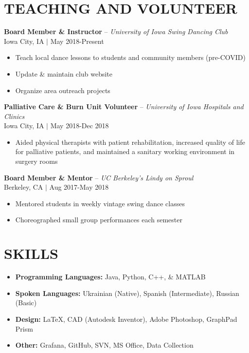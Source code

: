 \documentclass[line,margin]{res}
\begin{document}
\begin{resume}
\section{TEACHING AND VOLUNTEER} 


    {\bf Board Member \& Instructor} -- {\sl University of Iowa Swing Dancing Club} \\
    {\small Iowa City, IA $|$ May 2018-Present} 
    
     \begin{itemize} \itemsep -3pt
       \item Teach local dance lessons to students and community members (pre-COVID)
       \item Update \& maintain club website
       \item Organize area outreach projects
    \end{itemize}
    
    {\bf Palliative Care \& Burn Unit Volunteer} -- {\sl University of Iowa Hospitals and Clinics} \\
    {\small Iowa City, IA $|$ May 2018-Dec 2018} 
    
     \begin{itemize} \itemsep -3pt
       \item Aided physical therapists with patient rehabilitation, increased quality of life for palliative patients, and maintained a sanitary working environment in surgery rooms
    \end{itemize}
    
    {\bf Board Member \& Mentor} -- {\sl UC Berkeley's Lindy on Sproul} \\
    {\small Berkeley, CA $|$ Aug 2017-May 2018} 
    
     \begin{itemize} \itemsep -3pt
       \item Mentored students in weekly vintage swing dance classes
       \item Choreographed small group performances each semester
    \end{itemize}
    
\section{SKILLS}

    \begin{itemize}[leftmargin=*] \itemsep -2pt
	\item \textbf{Programming Languages:} Java, Python, C++, \& MATLAB
	\item \textbf{Spoken Languages:} Ukrainian (Native), Spanish (Intermediate), Russian (Basic)
	\item \textbf{Design:} LaTeX, CAD (Autodesk Inventor), Adobe Photoshop, GraphPad Prism
	\item \textbf{Other:} Grafana, GitHub, SVN, MS Office, Data Collection

    \end{itemize}
    
\end{resume}
\end{document}
